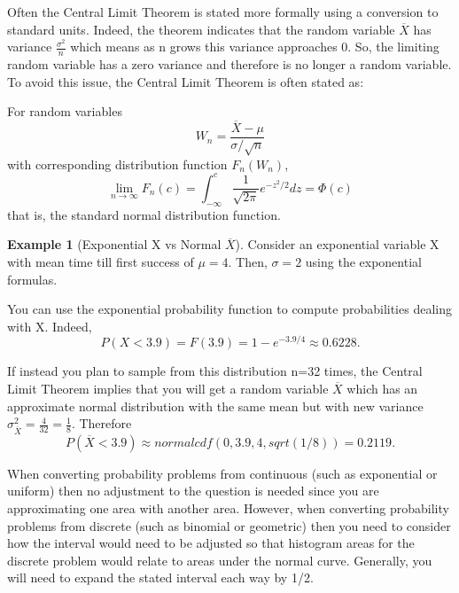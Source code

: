 \documentclass[10pt,]{book}
\theoremstyle{plain}
\theoremstyle{definition}
\theoremstyle{definition}
\newtheorem{example}[theorem]{Example}
\theoremstyle{definition}
\numberwithin{equation}{section}
\newcommand{\lt}{ < }
\begin{document}
Often the Central Limit Theorem is stated more formally using a conversion to standard units. Indeed, the theorem indicates that the random variable \(\overline{X}\) has variance \(\frac{\sigma^2}{n}\) which means as n grows this variance approaches 0. So, the limiting random variable has a zero variance and therefore is no longer a random variable. To avoid this issue, the Central Limit Theorem is often stated as:
%
\par
For random variables
\begin{equation*}W_n = \frac{\overline{X} - \mu}{\sigma/ \sqrt{n}}\end{equation*}
with corresponding distribution function \(F_n(W_n)\),
\begin{equation*}\lim_{n \rightarrow \infty} F_n(c) = \int_{-\infty}^c \frac{1}{\sqrt{2 \pi}} e^{-z^2/2} dz = \Phi(c)\end{equation*}
that is, the standard normal distribution function.
%
\begin{example}[Exponential X vs Normal \(\overline{X}\)]\label{example-22}
Consider an exponential variable X with mean time till first success of \(\mu = 4\).  Then, \(\sigma = 2\) using the exponential formulas.
%
\par
You can use the exponential probability function to compute probabilities dealing with X. Indeed,
\begin{equation*}P(X \lt 3.9) = F(3.9) = 1 - e^{-3.9/4} \approx 0.6228 .\end{equation*}
%
\par

If instead you plan to sample from this distribution n=32 times, the Central Limit Theorem implies that you will get a random variable \(\overline{X}\) which has an approximate normal distribution with the same mean but with new variance \(\sigma_{\overline{X}}^2 = \frac{4}{32} = \frac{1}{8}\).  Therefore
\begin{equation*}P( \overline{X} \lt 3.9 ) \approx normalcdf(0,3.9,4,sqrt(1/8)) = 0.2119 .\end{equation*}
%
\end{example}
\par
When converting probability problems from continuous (such as exponential or uniform) then no adjustment to the question is needed since you are approximating one area with another area. However, when converting probability problems from discrete (such as binomial or geometric) then you need to consider how the interval would need to be adjusted so that histogram areas for the discrete problem would relate to areas under the normal curve. Generally, you will need to expand the stated interval each way by 1/2.
%
\par
\end{document}
